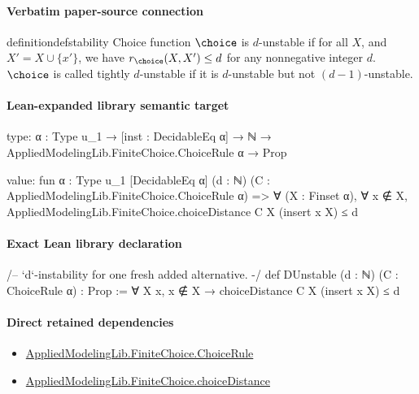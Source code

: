 \documentclass[10pt]{article}
\begin{document}
\paragraph{Verbatim paper-source connection}
\begin{ReviewVerbatim}
\begin{restatable}[$d$-Instability]{definition}{defstability}
\label{def:d-instability}
Choice function $\choice$ is $d$-unstable if for all $X$, and $X' = X \cup \{x'\}$, we have $r_\choice(X, X') \leq d$ for any nonnegative integer $d$. $\choice$ is called tightly $d$-unstable if it is $d$-unstable but not $(d-1)$-unstable.
\end{restatable}
\end{ReviewVerbatim}



\paragraph{Lean-expanded library semantic target}
\begin{ReviewVerbatim}
type:
{α : Type u_1} → [inst : DecidableEq α] → ℕ → AppliedModelingLib.FiniteChoice.ChoiceRule α → Prop

value:
fun {α : Type u_1} [DecidableEq α] (d : ℕ) (C : AppliedModelingLib.FiniteChoice.ChoiceRule α) =>
  ∀ (X : Finset α), ∀ x ∉ X, AppliedModelingLib.FiniteChoice.choiceDistance C X (insert x X) ≤ d
\end{ReviewVerbatim}

\paragraph{Exact Lean library declaration}
\begin{ReviewVerbatim}
/-- `d`-instability for one fresh added alternative. -/
def DUnstable (d : ℕ) (C : ChoiceRule α) : Prop :=
  ∀ X x, x ∉ X → choiceDistance C X (insert x X) ≤ d
\end{ReviewVerbatim}

\paragraph{Direct retained dependencies}
\begin{itemize}\raggedright
\item \hyperlink{library-prerequisite-5dea5c3766008208}{Applied\allowbreak{}Modeling\allowbreak{}Lib.\allowbreak{}Finite\allowbreak{}Choice.\allowbreak{}Choice\allowbreak{}Rule}
\item \hyperlink{library-prerequisite-e6cfa04e2407529a}{Applied\allowbreak{}Modeling\allowbreak{}Lib.\allowbreak{}Finite\allowbreak{}Choice.\allowbreak{}choice\allowbreak{}Distance}
\end{itemize}
\end{document}

